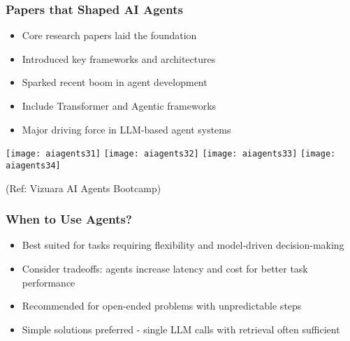 \begin{frame}[fragile]\frametitle{Papers that Shaped AI Agents}

      \begin{itemize}
        \item Core research papers laid the foundation
        \item Introduced key frameworks and architectures
        \item Sparked recent boom in agent development
        \item Include Transformer and Agentic frameworks
        \item Major driving force in LLM-based agent systems
      \end{itemize}

		\begin{center}
		\texttt{[image: aiagents31]}
		\texttt{[image: aiagents32]}
		\texttt{[image: aiagents33]}
		\texttt{[image: aiagents34]}
		
		{\tiny (Ref: Vizuara AI Agents Bootcamp)}
		\end{center}	
 
\end{frame}

\begin{frame}[fragile]\frametitle{When to Use Agents?}
    \begin{itemize}
        \item Best suited for tasks requiring flexibility and model-driven decision-making
        \item Consider tradeoffs: agents increase latency and cost for better task performance
        \item Recommended for open-ended problems with unpredictable steps
        \item Simple solutions preferred - single LLM calls with retrieval often sufficient
    \end{itemize}
\end{frame}

